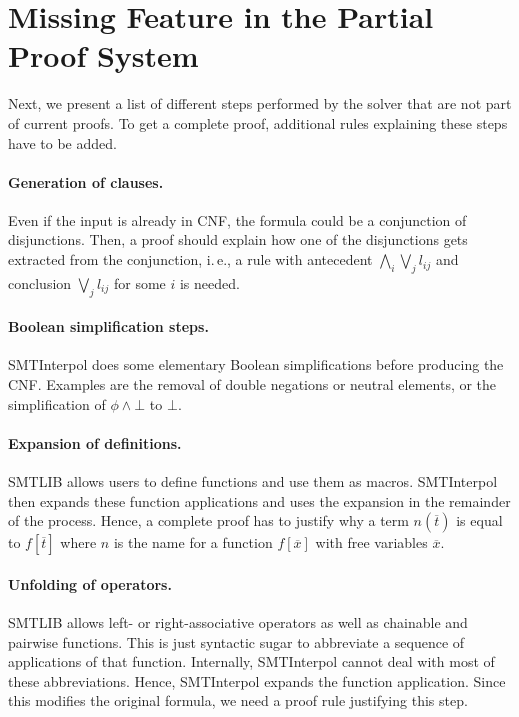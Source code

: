 \documentclass[a4paper]{article}
\newcommand\si{SMTInterpol\xspace}
\begin{document}
\section{Missing Feature in the Partial Proof System}
Next, we present a list of different steps performed by the solver that are
not part of current proofs.  To get a complete proof, additional
rules explaining these steps have to be added.

\paragraph{Generation of clauses.}  Even if the input is already in CNF, the
formula could be a conjunction of disjunctions.  Then, a proof should explain
how one of the disjunctions gets extracted from the conjunction, i.\,e., a
rule with antecedent $\bigwedge_i\bigvee_j l_{ij}$ and conclusion $\bigvee_j
l_{ij}$ for some $i$ is needed.

\paragraph{Boolean simplification steps.}  \si does some elementary Boolean
simplifications before producing the CNF.  Examples are the removal of double
negations or neutral elements,  or the simplification of $\phi\land\bot$ to
$\bot$.

\paragraph{Expansion of definitions.}  SMTLIB allows users to define functions
and use them as macros.  \si then expands these function applications and uses
the expansion in the remainder of the process.  Hence, a complete proof has to
justify why a term $n(\overline{t})$ is equal to $f[\overline{t}]$ where $n$
is the name for a function $f[\overline{x}]$ with free variables
$\overline{x}$.

\paragraph{Unfolding of operators.}  SMTLIB allows left- or right-associative
operators as well as chainable and pairwise functions.  This is just syntactic
sugar to abbreviate a sequence of applications of that function.  Internally,
\si cannot deal with most of these abbreviations.  Hence, \si expands the
function application.  Since this modifies the original formula, we need
a proof rule justifying this step.
\end{document}
